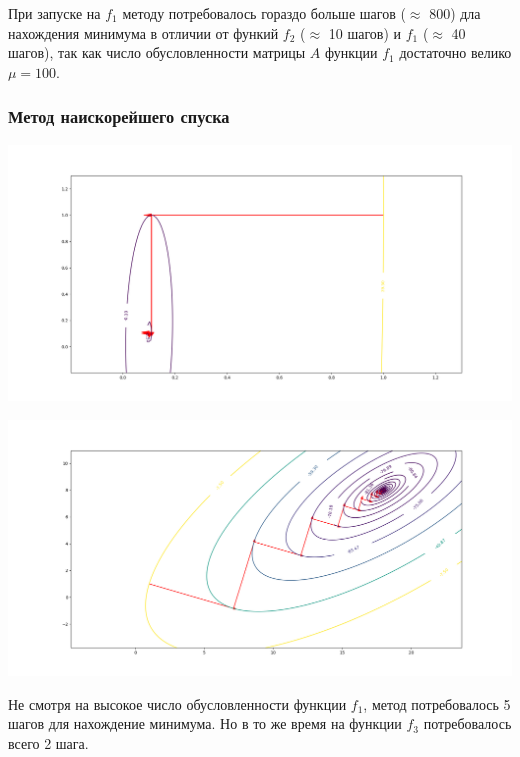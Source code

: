 \documentclass[english]{article}
\theoremstyle{plain}
\theoremstyle{remark}
\theoremstyle{definition}
\begin{document}
При запуске на \(f_1\) методу потребовалось гораздо больше шагов
(\(\approx\) 800) дла нахождения минимума в отличии от функий \(f_2\)
(\(\approx\) 10 шагов) и \(f_1\) (\(\approx\) 40 шагов), так как число
обусловленности матрицы \(A\) функции \(f_1\) достаточно велико \(\mu
= 100\).
\subsubsection{Метод наискорейшего спуска}
\label{sec:org8377267}
\begin{center}
\includegraphics[H,scale=0.3]{plots/traectories/steepest_descent_1.png}
\end{center}
\begin{center}
\includegraphics[H,scale=0.3]{plots/traectories/steepest_descent_3.png}
\end{center}

Не смотря на высокое число обусловленности функции \(f_1\), метод
потребовалось 5 шагов для нахождение минимума. Но в то же время на
функции \(f_3\) потребовалось всего 2 шага.
\end{document}
